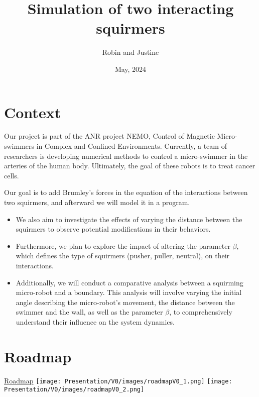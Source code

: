 \documentclass[options]{article}
\begin{document}
\title{Simulation of two interacting squirmers}
\author{Robin and Justine}
\date{May, 2024}
\maketitle

\section{Context}
Our project is part of the ANR project NEMO, Control of Magnetic Micro-swimmers in Complex and Confined Environments.
Currently, a team of researchers is developing numerical methods to control a micro-swimmer in the arteries
of the human body.
Ultimately, the goal of these robots is to treat cancer cells.

\vspace{0.5cm}
Our goal is to add Brumley's forces in the equation of the interactions between two squirmers, 
and afterward we will model it in a program. 
\begin{itemize}
    \item We also aim to investigate the effects of varying the distance between the squirmers to observe
    potential modifications in their behaviors.
    \item Furthermore, we plan to explore the impact of altering the parameter $\beta$, which defines the
    type of squirmers (pusher, puller, neutral), on their interactions.
    \item Additionally, we will conduct a comparative analysis between a squirming micro-robot and a 
    boundary. This analysis will involve varying the initial angle describing the micro-robot's 
    movement, the distance between the swimmer and the wall, as well as the parameter $\beta$, 
    to comprehensively understand their influence on the system dynamics.
\end{itemize}

\newpage
\section{Roadmap}
\begin{center}
    \href{https://github.com/orgs/master-csmi/projects/23/views/2}{Roadmap}
    \texttt{[image: Presentation/V0/images/roadmapV0\_1.png]}
    \vspace{1em} %
    \texttt{[image: Presentation/V0/images/roadmapV0\_2.png]}
\end{center}


\nocite{*}


\end{document}
